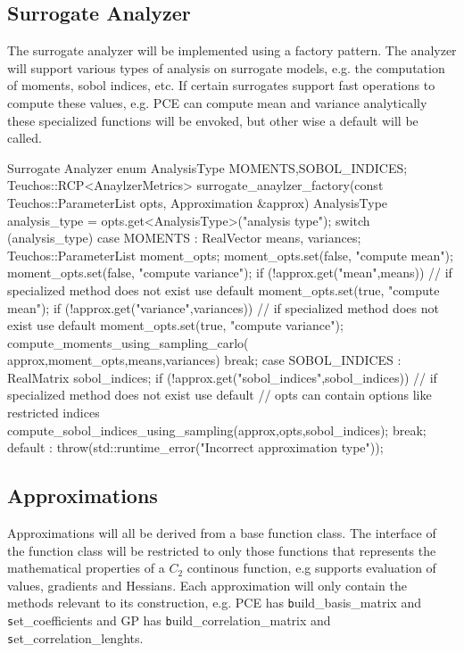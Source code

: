 \documentclass[dakotalogo]{dakota-article}
\begin{document}
\subsection{Surrogate Analyzer}
The surrogate analyzer will be implemented using a factory pattern. The analyzer will support various types of analysis on surrogate models, e.g. the computation of moments, sobol indices, etc. If certain surrogates support fast operations to compute these values, e.g. PCE can compute mean and variance analytically these specialized functions will be envoked, but other wise a default will be called.
\begin{codelisting}{Surrogate Analyzer}
enum AnalysisType {MOMENTS,SOBOL_INDICES};
Teuchos::RCP<AnaylzerMetrics> surrogate_anaylzer_factory(const Teuchos::ParameterList opts, Approximation &approx){
  AnalysisType analysis_type = opts.get<AnalysisType>("analysis type");
  switch (analysis_type){
    case MOMENTS : {
      RealVector means, variances;
      Teuchos::ParameterList moment_opts;
      moment_opts.set(false, "compute mean");
      moment_opts.set(false, "compute variance");
      if (!approx.get("mean",means))
      // if specialized method does not exist use default
      moment_opts.set(true, "compute mean");
      if (!approx.get("variance",variances))
      // if specialized method does not exist use default
      moment_opts.set(true, "compute variance");
      compute_moments_using_sampling_carlo(
      approx,moment_opts,means,variances)
      break;
    }
    case SOBOL_INDICES : { 
      RealMatrix sobol_indices;
      if (!approx.get("sobol_indices",sobol_indices))
      // if specialized method does not exist use default
      // opts can contain options like restricted indices
      compute_sobol_indices_using_sampling(approx,opts,sobol_indices);
      break;
    }
    default : {
      throw(std::runtime_error("Incorrect approximation type"));
    }
  }
}
\end{codelisting}

\subsection{Approximations}
Approximations will all be derived from a base function class. The interface of the function class will be restricted to only those functions that represents the mathematical properties of a $C_2$ continous function, e.g supports evaluation of values, gradients and Hessians. Each approximation will only contain the methods relevant to its construction, e.g. PCE has {\texttt build\_basis\_matrix} and {\texttt set\_coefficients} and GP has {\texttt build\_correlation\_matrix} and {\texttt set\_correlation\_lenghts}.
\end{document}
